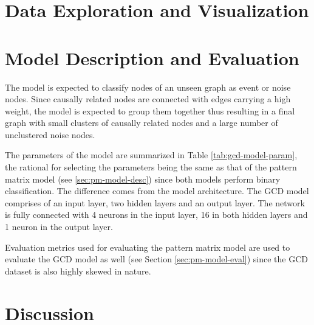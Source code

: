 \section{Data Exploration and Visualization}
\label{sec:gcd-data-exp}

\section{Model Description and Evaluation}
\label{sec:gcd-model-desc-eval}

The model is expected to classify nodes of an unseen graph as event or
noise nodes. Since causally related nodes are connected with edges
carrying a high weight, the model is expected to group them together
thus resulting in a final graph with small clusters of causally
related nodes and a large number of unclustered noise nodes.

The parameters of the model are summarized in Table
\ref{tab:gcd-model-param}, the rational for selecting the parameters
being the same as that of the pattern matrix model (see
\ref{sec:pm-model-desc}) since both models perform binary
classification. The difference comes from the model architecture. The
GCD model comprises of an input layer, two hidden layers and an output
layer. The network is fully connected with 4 neurons in the input
layer, 16 in both hidden layers and 1 neuron in the output layer.

Evaluation metrics used for evaluating the pattern matrix model are
used to evaluate the GCD model as well (see Section
\ref{sec:pm-model-eval}) since the GCD dataset is also highly skewed
in nature.

\section{Discussion}
\label{sec[gcd-disc]}

